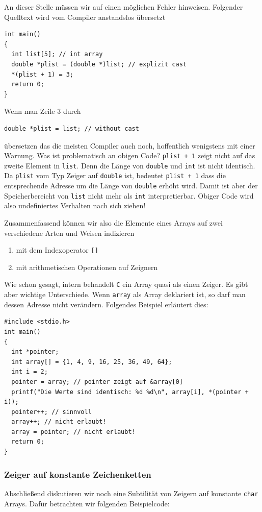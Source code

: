 An dieser Stelle müssen wir auf einen möglichen Fehler hinweisen.
Folgender Quelltext wird vom Compiler anstandslos übersetzt
\begin{lstlisting}
int main()
{
  int list[5]; // int array
  double *plist = (double *)list; // explizit cast
  *(plist + 1) = 3;
  return 0;
}
\end{lstlisting}
Wenn man Zeile $3$ durch
\begin{lstlisting}
double *plist = list; // without cast
\end{lstlisting}
übersetzen das die meisten Compiler auch noch, hoffentlich wenigstens mit einer Warnung.
Was ist problematisch an obigen Code?
\verb|plist + 1| zeigt nicht auf das zweite Element in \verb|list|.
Denn die Länge von \verb|double| und \verb|int| ist nicht identisch.
Da \verb|plist| vom Typ Zeiger auf \verb|double| ist, bedeutet \verb|plist + 1| dass die entsprechende Adresse um die Länge von \verb|double| erhöht wird.
Damit ist aber der Speicherbereicht von \verb|list| nicht mehr als \verb|int| interpretierbar.
Obiger Code wird also undefiniertes Verhalten nach sich ziehen!

Zusammenfassend können wir also die Elemente eines Arrays auf zwei verschiedene Arten und Weisen indizieren
\begin{enumerate}
\item mit dem Indexoperator \verb|[]|
\item mit arithmetischen Operationen auf Zeignern
\end{enumerate}
Wie schon gesagt, intern behandelt \texttt{C} ein Array quasi als einen Zeiger.
Es gibt aber wichtige Unterschiede.
Wenn \verb|array| als Array deklariert ist, so darf man dessen Adresse nicht verändern.
Folgendes Beispiel erläutert dies:
\begin{lstlisting}
#include <stdio.h>
int main()
{
  int *pointer;
  int array[] = {1, 4, 9, 16, 25, 36, 49, 64};
  int i = 2;
  pointer = array; // pointer zeigt auf &array[0]
  printf("Die Werte sind identisch: %d %d\n", array[i], *(pointer + i));
  pointer++; // sinnvoll
  array++; // nicht erlaubt!
  array = pointer; // nicht erlaubt!
  return 0;
}
\end{lstlisting}

\subsubsection{Zeiger auf konstante Zeichenketten}

Abschließend diskutieren wir noch eine Subtilität von Zeigern auf konstante \verb|char| Arrays.
Dafür betrachten wir folgenden Beispielcode:

